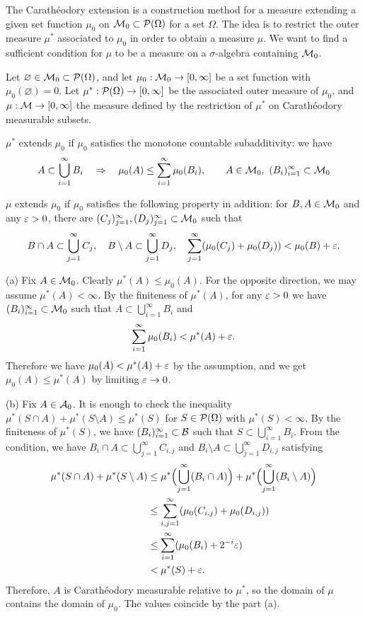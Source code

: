 \documentclass{../../large}
\begin{document}
\begin{prb}
The Carath\'eodory extension is a construction method for a measure extending a given set function $\mu_0$ on $\mathcal{M}_0\subset\mathcal{P}(\Omega)$ for a set $\Omega$.
The idea is to restrict the outer measure $\mu^*$ associated to $\mu_0$ in order to obtain a measure $\mu$.
We want to find a sufficient condition for $\mu$ to be a measure on a $\sigma$-algebra containing $\mathcal{M}_0$.

Let $\varnothing\in\mathcal{M}_0\subset\mathcal{P}(\Omega)$, and let $\mu_0:\mathcal{M}_0\to[0,\infty]$ be a set function with $\mu_0(\varnothing)=0$.
Let $\mu^*:\mathcal{P}(\Omega)\to[0,\infty]$ be the associated outer measure of $\mu_0$, and $\mu:\mathcal{M}\to[0,\infty]$ the measure defined by the restriction of $\mu^*$ on Carath\'eodory measurable subsets.
\begin{parts}
\item
$\mu^*$ extends $\mu_0$ if $\mu_0$ satisfies the monotone countable subadditivity: we have
\[A\subset\bigcup_{i=1}^\infty B_i\quad\Rightarrow\quad\mu_0(A)\le\sum_{i=1}^\infty\mu_0(B_i),\qquad A\in\mathcal{M}_0,\ (B_i)_{i=1}^\infty\subset\mathcal{M}_0\]
\item
$\mu$ extends $\mu_0$ if $\mu_0$ satisfies the following property in addition: for $B,A\in\mathcal{M}_0$ and any $\varepsilon>0$, there are $(C_j)_{j=1}^\infty,(D_j)_{j=1}^\infty\subset\mathcal{M}_0$ such that
\[B\cap A\subset\bigcup_{j=1}^\infty C_j,\quad B\setminus A\subset\bigcup_{j=1}^\infty D_j,\quad\sum_{j=1}^\infty(\mu_0(C_j)+\mu_0(D_j))<\mu_0(B)+\varepsilon.\]
\end{parts}
\end{prb}
\begin{pf}
(a)
Fix $A\in\mathcal{M}_0$.
Clearly $\mu^*(A)\le\mu_0(A)$.
For the opposite direction, we may assume $\mu^*(A)<\infty$.
By the finiteness of $\mu^*(A)$, for any $\varepsilon>0$ we have $(B_i)_{i=1}^\infty\subset\mathcal{M}_0$ such that $A\subset\bigcup_{i=1}^\infty B_i$ and
\[\sum_{i=1}^\infty\mu_0(B_i)<\mu^*(A)+\varepsilon.\]
Therefore we have $\mu_0(A)<\mu^*(A)+\varepsilon$ by the assumption, and we get $\mu_0(A)\le\mu^*(A)$ by limiting $\varepsilon\to0$.

(b)
Fix $A\in\mathcal{A}_0$.
It is enough to check the inequality $\mu^*(S\cap A)+\mu^*(S\setminus A)\le\mu^*(S)$ for $S\in\mathcal{P}(\Omega)$ with $\mu^*(S)<\infty$.
By the finiteness of $\mu^*(S)$, we have $(B_i)_{i=1}^\infty\subset\mathcal{B}$ such that $S\subset\bigcup_{i=1}^\infty B_i$.
From the condition, we have $B_i\cap A\subset\bigcup_{j=1}^\infty C_{i,j}$ and $B_i\setminus A\subset\bigcup_{j=1}^\infty D_{i,j}$ satisfying
\begin{align*}
\mu^*(S\cap A)+\mu^*(S\setminus A)
&\le\mu^*\Bigl(\bigcup_{j=1}^\infty(B_i\cap A)\Bigr)+\mu^*\Bigl(\bigcup_{j=1}^\infty(B_i\setminus A)\Bigr)\\
&\le\sum_{i,j=1}^\infty(\mu_0(C_{i,j})+\mu_0(D_{i,j}))\\
&\le\sum_{i=1}^\infty(\mu_0(B_i)+2^{-i}\varepsilon)\\
&<\mu^*(S)+\varepsilon.
\end{align*}
Therefore, $A$ is Carath\'eodory measurable relative to $\mu^*$, so the domain of $\mu$ contains the domain of $\mu_0$.
The values coincide by the part (a).
\end{pf}
\end{document}
